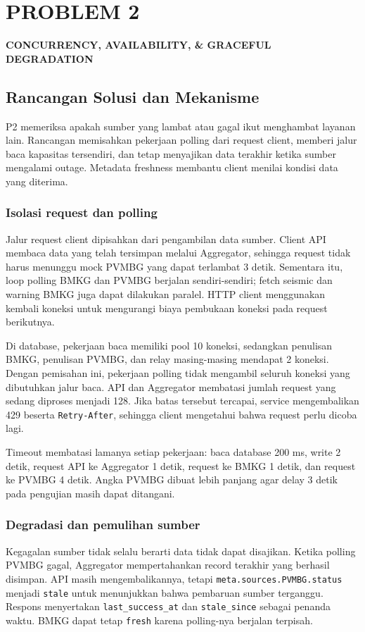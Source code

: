 \chapter{PROBLEM 2}
\begin{center}\large\bfseries CONCURRENCY, AVAILABILITY, \& GRACEFUL DEGRADATION\end{center}

\section{Rancangan Solusi dan Mekanisme}
P2 memeriksa apakah sumber yang lambat atau gagal ikut menghambat layanan lain. Rancangan memisahkan pekerjaan polling dari request client, memberi jalur baca kapasitas tersendiri, dan tetap menyajikan data terakhir ketika sumber mengalami outage. Metadata freshness membantu client menilai kondisi data yang diterima.

\subsection{Isolasi request dan polling}
Jalur request client dipisahkan dari pengambilan data sumber. Client API membaca data yang telah tersimpan melalui Aggregator, sehingga request tidak harus menunggu mock PVMBG yang dapat terlambat 3 detik. Sementara itu, loop polling BMKG dan PVMBG berjalan sendiri-sendiri; fetch seismic dan warning BMKG juga dapat dilakukan paralel. HTTP client menggunakan kembali koneksi untuk mengurangi biaya pembukaan koneksi pada request berikutnya.

Di database, pekerjaan baca memiliki pool 10 koneksi, sedangkan penulisan BMKG, penulisan PVMBG, dan relay masing-masing mendapat 2 koneksi. Dengan pemisahan ini, pekerjaan polling tidak mengambil seluruh koneksi yang dibutuhkan jalur baca. API dan Aggregator membatasi jumlah request yang sedang diproses menjadi 128. Jika batas tersebut tercapai, service mengembalikan 429 beserta \texttt{Retry-After}, sehingga client mengetahui bahwa request perlu dicoba lagi.

Timeout membatasi lamanya setiap pekerjaan: baca database 200 ms, write 2 detik, request API ke Aggregator 1 detik, request ke BMKG 1 detik, dan request ke PVMBG 4 detik. Angka PVMBG dibuat lebih panjang agar delay 3 detik pada pengujian masih dapat ditangani.

\subsection{Degradasi dan pemulihan sumber}
Kegagalan sumber tidak selalu berarti data tidak dapat disajikan. Ketika polling PVMBG gagal, Aggregator mempertahankan record terakhir yang berhasil disimpan. API masih mengembalikannya, tetapi \texttt{meta.sources.PVMBG.status} menjadi \texttt{stale} untuk menunjukkan bahwa pembaruan sumber terganggu. Respons menyertakan \texttt{last\_success\_at} dan \texttt{stale\_since} sebagai penanda waktu. BMKG dapat tetap \texttt{fresh} karena polling-nya berjalan terpisah.

